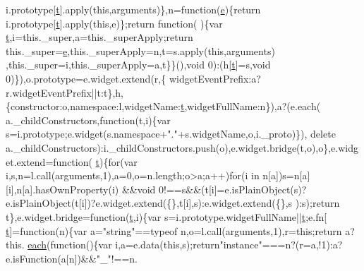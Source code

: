 \begin{DoxyCode}
      i.prototype[\hyperlink{jquery-2_80_83_8min_8js_aaccc9105df5383111407fd5b41255e23}{t}].apply(\textcolor{keyword}{this},arguments)\},n=\textcolor{keyword}{function}(\hyperlink{jquery-ui_8min_8js_a2c038346d47955cbe2cb91e338edd7e1}{e})\{\textcolor{keywordflow}{return} i.prototype[\hyperlink{jquery-2_80_83_8min_8js_aaccc9105df5383111407fd5b41255e23}{t}].apply(\textcolor{keyword}{this},e)\};\textcolor{keywordflow}{return} \textcolor{keyword}{function}(
      )\{var \hyperlink{jquery-2_80_83_8min_8js_aaccc9105df5383111407fd5b41255e23}{t},i=this.\_super,a=this.\_superApply;\textcolor{keywordflow}{return} this.\_super=\hyperlink{jquery-ui_8min_8js_a2c038346d47955cbe2cb91e338edd7e1}{e},this.\_superApply=n,t=s.apply(\textcolor{keyword}{this},arguments)
      ,this.\_super=i,this.\_superApply=a,t\}\}(),\textcolor{keywordtype}{void} 0):(h[\hyperlink{jquery-2_80_83_8min_8js_aaccc9105df5383111407fd5b41255e23}{t}]=s,\textcolor{keywordtype}{void} 0)\}),o.prototype=e.widget.extend(r,\{
      widgetEventPrefix:a?r.widgetEventPrefix||t:t\},h,\{constructor:o,\textcolor{keyword}{namespace}:l,widgetName:\hyperlink{jquery-2_80_83_8min_8js_aaccc9105df5383111407fd5b41255e23}{t},widgetFullName:n\}),a?(e.each(
      a.\_childConstructors,\textcolor{keyword}{function}(t,i)\{var s=i.prototype;e.widget(s.namespace+\textcolor{stringliteral}{"."}+s.widgetName,o,i.\_proto)\}),\textcolor{keyword}{
      delete} a.\_childConstructors):i.\_childConstructors.push(o),e.widget.bridge(t,o),o\},e.widget.extend=\textcolor{keyword}{function}(
      \hyperlink{jquery-2_80_83_8min_8js_aaccc9105df5383111407fd5b41255e23}{t})\{\textcolor{keywordflow}{for}(var i,s,n=l.call(arguments,1),a=0,o=n.length;o>a;a++)\textcolor{keywordflow}{for}(i in n[a])s=n[a][i],n[a].hasOwnProperty(i)
      &&\textcolor{keywordtype}{void} 0!==s&&(t[i]=e.isPlainObject(s)?e.isPlainObject(t[i])?e.widget.extend(\{\},t[i],s):e.widget.extend(\{\},s
      ):s);\textcolor{keywordflow}{return} t\},e.widget.bridge=\textcolor{keyword}{function}(\hyperlink{jquery-2_80_83_8min_8js_aaccc9105df5383111407fd5b41255e23}{t},i)\{var s=i.prototype.widgetFullName||\hyperlink{jquery-2_80_83_8min_8js_aaccc9105df5383111407fd5b41255e23}{t};e.fn[
      \hyperlink{jquery-2_80_83_8min_8js_aaccc9105df5383111407fd5b41255e23}{t}]=\textcolor{keyword}{function}(n)\{var a=\textcolor{stringliteral}{"string"}==typeof n,o=l.call(arguments,1),r=\textcolor{keyword}{this};\textcolor{keywordflow}{return} a?this.
      \hyperlink{jquery-2_80_83_8min_8js_acac159895212e159f5cbd2080cc4d737}{each}(\textcolor{keyword}{function}()\{var i,a=e.data(\textcolor{keyword}{this},s);\textcolor{keywordflow}{return}\textcolor{stringliteral}{"instance"}===n?(r=a,!1):a?e.isFunction(a[n])&&\textcolor{stringliteral}{"\_"}!==n.

\end{DoxyCode}
